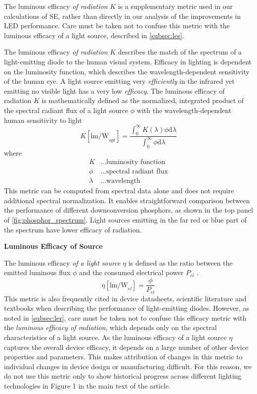 \documentclass[parskip=full]{article}
\begin{document}
The luminous efficacy \textit{of radiation} $K$ is a supplementary metric used in our calculations of SE, rather than directly in our analysis of the improvements in LED performance. Care must be taken not to confuse this metric with the luminous efficacy of a light source, described in \cref{subsec:les}.

The luminous efficacy \textit{of radiation} $K$ describes the match of the spectrum of a light-emitting diode to the human visual system. Efficacy in lighting is dependent on the luminosity function, which describes the wavelength-dependent sensitivity of the human eye. A light source emitting very \textit{efficiently} in the infrared yet emitting no visible light has a very low \textit{efficacy}. The luminous efficacy of radiation $K$ is mathematically defined as the normalized, integrated product of the spectral radiant flux of a light source $\phi$ with the wavelength-dependent human sensitivity to light \cite{cie-term-effrad}
%
\begin{equation}
\label{eqn:ler}
    K [\text{lm/W}_{opt}]= \frac{\int_0^\infty K( \lambda ) \phi \text{d} \lambda}{\int_0^\infty \phi \text{d} \lambda}
\end{equation}
%
where
%
\begin{align*}
    K &\dots \text{luminosity function} \\
    \phi &\dots \text{spectral radiant flux} \\
    \lambda &\dots \text{wavelength}
\end{align*}
%
This metric can be computed from spectral data alone and does not require additional spectral normalization. It enables straightforward comparison between the performance of different downconversion phosphors, as shown in the top panel of \cref{fig:phosphor_spectrum}. Light sources emitting in the far red or blue part of the spectrum have lower efficacy of radiation.

\textbf{Luminous Efficacy of Source}
\label{subsec:les}

The luminous efficacy \textit{of a light source} $\eta$ is defined as the ratio between the emitted luminous flux $\phi$ and the consumed electrical power $P_{el}$ \cite{cie-term-effsrc}.
%
\begin{equation}
    \eta [\text{lm/W}_{el}]= \frac{\phi}{P_{el}}
\end{equation}
%
This metric is also frequently cited in device datasheets, scientific literature and textbooks when describing the performance of light-emitting diodes. However, as noted in \cref{subsec:ler}, care must be taken not to confuse this efficacy metric with the \textit{luminous efficacy of radiation}, which depends only on the spectral characteristics of a light source. As the luminous efficacy of a light source $\eta$ captures the overall device efficacy, it depends on a large number of other device properties and parameters. This makes attribution of changes in this metric to individual changes in device design or manufacturing difficult. For this reason, we do not use this metric only to show historical progress across different lighting technologies in Figure 1 in the main text of the article.
\end{document}
